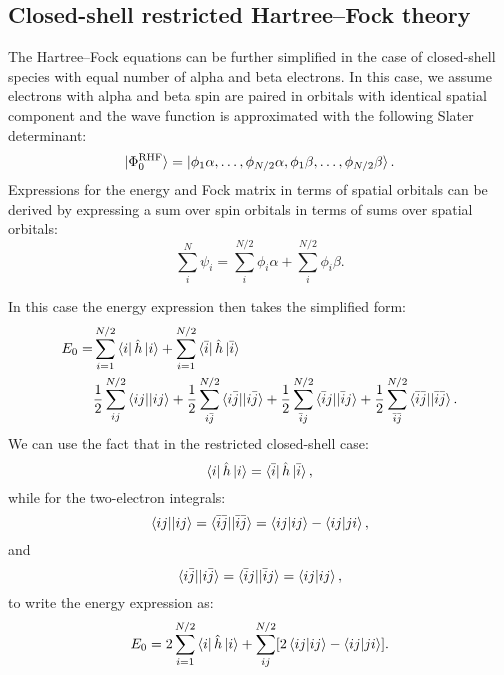 \documentclass[../Main/chem532-notes.tex]{subfiles}
\begin{document}
\subsection{Closed-shell restricted Hartree--Fock theory}
The Hartree--Fock equations can be further simplified in the case of closed-shell species with equal number of alpha and beta electrons.
In this case, we assume electrons with alpha and beta spin are paired in orbitals with identical spatial component and the wave function is approximated with the following Slater determinant:
\begin{equation}
\ket{\Phi_0^\mathrm{RHF}} = \ket{\phi_1 \alpha,\ldots, \phi_{N/2} \alpha,
\phi_1 \beta,\ldots, \phi_{N/2} \beta}.
\end{equation}
Expressions for the energy and Fock matrix in terms of spatial orbitals can be derived by expressing a sum over spin orbitals in terms of sums over spatial orbitals:
\begin{equation}
\sum_{i}^{N} \psi_i = \sum_{i}^{N/2} \phi_i \alpha + \sum_{i}^{N/2} \phi_i \beta.
\end{equation}

In this case the energy expression then takes the simplified form:
\begin{equation}
\begin{split}
E_0 =& \sum_{i=1}^{N/2} \bra{i} \hat{h} \ket{i} + \sum_{i = 1}^{N/2} \bra{\bar{i}} \hat{h} \ket{\bar{i}} \\
& \frac{1}{2} \sum_{ij}^{N/2} \bra{ij}\!\ket{ij}
+ \frac{1}{2} \sum_{i\bar{j}}^{N/2} \bra{i\bar{j}}\!\ket{i\bar{j}}
+ \frac{1}{2} \sum_{\bar{i}j}^{N/2} \bra{\bar{i}j}\!\ket{\bar{i}j}
+ \frac{1}{2} \sum_{\bar{i}\bar{j}}^{N/2} \bra{\bar{i}\bar{j}}\!\ket{\bar{i}\bar{j}}.
\end{split}
\end{equation}
We can use the fact that in the restricted closed-shell case:
\begin{equation}
\bra{i} \hat{h} \ket{i} = \bra{\bar{i}} \hat{h} \ket{\bar{i}},
\end{equation}
while for the two-electron integrals:
\begin{equation}
\bra{ij}\!\ket{ij} = \bra{\bar{i}\bar{j}}\!\ket{\bar{i}\bar{j}} 
= \braket{ij|ij} - \braket{ij|ji},
\end{equation}
and
\begin{equation}
\bra{i\bar{j}}\!\ket{i\bar{j}} = \bra{\bar{i}j}\!\ket{\bar{i}j}  = 
\braket{ij|ij},
\end{equation}
to write the energy expression as:
\begin{equation}
E_0 = 2 \sum_{i=1}^{N/2} \bra{i} \hat{h} \ket{i} 
+ \sum_{ij}^{N/2} [ 2 \braket{ij|ij} - \braket{ij|ji} ].
\end{equation}
\end{document}
